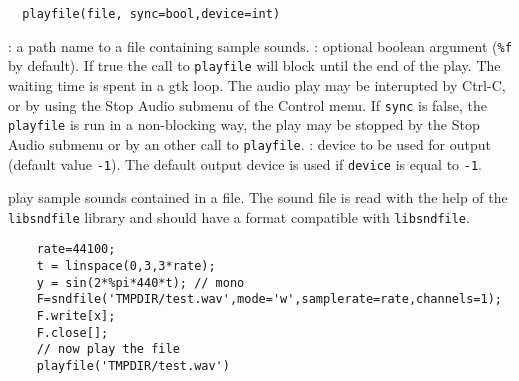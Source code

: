 
\begin{mandesc}
\end{mandesc}
\begin{calling_sequence}
\begin{verbatim}
  playfile(file, sync=bool,device=int)
\end{verbatim}
\end{calling_sequence}
\begin{parameters}
  \begin{varlist}
    : a path name to a file containing sample sounds. 
    : optional boolean argument (\verb+%f+ by default). 
    If true the call to \verb+playfile+ 
    will block until the end of the play. The waiting time is spent
    in a gtk loop. The audio play may be interupted by 
    Ctrl-C, or by using the Stop Audio submenu of the Control menu. 
    If \verb+sync+ is false, the \verb+playfile+ is run in a non-blocking way, the 
    play may be stopped by the  Stop Audio submenu or by an other call 
    to \verb+playfile+. 
   : device to be used for output (default value \verb+-1+). The default output 
   device is used if \verb+device+ is equal to \verb+-1+.
  \end{varlist}
\end{parameters}

\begin{mandescription}
  play sample sounds contained in a file. The sound file is read with 
  the help of the \verb+libsndfile+ library and should have a format compatible with 
  \verb+libsndfile+.
\end{mandescription}
\begin{examples}
  \begin{Verbatim}
    rate=44100;
    t = linspace(0,3,3*rate);
    y = sin(2*%pi*440*t); // mono 
    F=sndfile('TMPDIR/test.wav',mode='w',samplerate=rate,channels=1);
    F.write[x];
    F.close[];
    // now play the file 
    playfile('TMPDIR/test.wav')
  \end{Verbatim}
\end{examples}
\begin{manseealso}
\end{manseealso}

